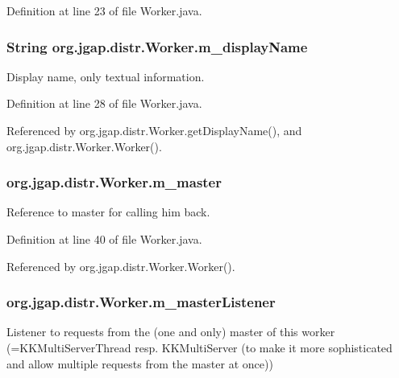Definition at line 23 of file Worker.\-java.

\hypertarget{classorg_1_1jgap_1_1distr_1_1_worker_a4f95b57112e0f70df3c4dea695104cee}{
\subsubsection[{m\-\_\-display\-Name}]{\setlength{\rightskip}{0pt plus 5cm}String org.\-jgap.\-distr.\-Worker.\-m\-\_\-display\-Name\hspace{0.3cm}{\ttfamily [private]}}}\label{classorg_1_1jgap_1_1distr_1_1_worker_a4f95b57112e0f70df3c4dea695104cee}
Display name, only textual information. 

Definition at line 28 of file Worker.\-java.



Referenced by org.\-jgap.\-distr.\-Worker.\-get\-Display\-Name(), and org.\-jgap.\-distr.\-Worker.\-Worker().

\hypertarget{classorg_1_1jgap_1_1distr_1_1_worker_a70aaa7dde62236412db41eaf80187c57}{
\subsubsection[{m\-\_\-master}]{ org.\-jgap.\-distr.\-Worker.\-m\-\_\-master\hspace{0.3cm}{\ttfamily [private]}}}\label{classorg_1_1jgap_1_1distr_1_1_worker_a70aaa7dde62236412db41eaf80187c57}
Reference to master for calling him back. 

Definition at line 40 of file Worker.\-java.



Referenced by org.\-jgap.\-distr.\-Worker.\-Worker().

\hypertarget{classorg_1_1jgap_1_1distr_1_1_worker_aea3bcf9d90ca3b75efd3b342df8861e7}{
\subsubsection[{m\-\_\-master\-Listener}]{ org.\-jgap.\-distr.\-Worker.\-m\-\_\-master\-Listener\hspace{0.3cm}{\ttfamily [private]}}}\label{classorg_1_1jgap_1_1distr_1_1_worker_aea3bcf9d90ca3b75efd3b342df8861e7}
Listener to requests from the (one and only) master of this worker (=K\-K\-Multi\-Server\-Thread resp. K\-K\-Multi\-Server (to make it more sophisticated and allow multiple requests from the master at once)) 

